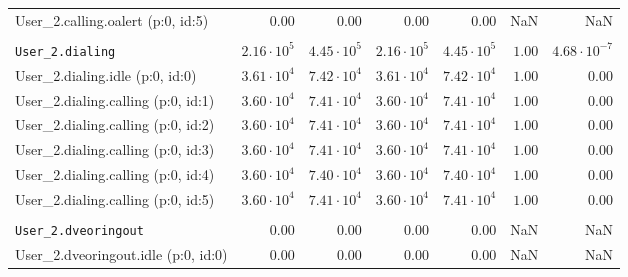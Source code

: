 \begin{table}[htbp]
{\begin{tabular}{lrrrrrr}
\hspace{3mm}User\_2.calling.oalert (p:0, id:5)       &              $0.00$ &              $0.00$ &              $0.00$ &              $0.00$ &                  NaN &                  NaN \\
\\[-8pt]\texttt{User\_2.dialing}                     & $2.16 \cdot 10^{5}$ & $4.45 \cdot 10^{5}$ & $2.16 \cdot 10^{5}$ & $4.45 \cdot 10^{5}$ &               $1.00$ & $4.68 \cdot 10^{-7}$ \\
\hspace{3mm}User\_2.dialing.idle (p:0, id:0)         & $3.61 \cdot 10^{4}$ & $7.42 \cdot 10^{4}$ & $3.61 \cdot 10^{4}$ & $7.42 \cdot 10^{4}$ &               $1.00$ &               $0.00$ \\
\hspace{3mm}User\_2.dialing.calling (p:0, id:1)      & $3.60 \cdot 10^{4}$ & $7.41 \cdot 10^{4}$ & $3.60 \cdot 10^{4}$ & $7.41 \cdot 10^{4}$ &               $1.00$ &               $0.00$ \\
\hspace{3mm}User\_2.dialing.calling (p:0, id:2)      & $3.60 \cdot 10^{4}$ & $7.41 \cdot 10^{4}$ & $3.60 \cdot 10^{4}$ & $7.41 \cdot 10^{4}$ &               $1.00$ &               $0.00$ \\
\hspace{3mm}User\_2.dialing.calling (p:0, id:3)      & $3.60 \cdot 10^{4}$ & $7.41 \cdot 10^{4}$ & $3.60 \cdot 10^{4}$ & $7.41 \cdot 10^{4}$ &               $1.00$ &               $0.00$ \\
\hspace{3mm}User\_2.dialing.calling (p:0, id:4)      & $3.60 \cdot 10^{4}$ & $7.40 \cdot 10^{4}$ & $3.60 \cdot 10^{4}$ & $7.40 \cdot 10^{4}$ &               $1.00$ &               $0.00$ \\
\hspace{3mm}User\_2.dialing.calling (p:0, id:5)      & $3.60 \cdot 10^{4}$ & $7.41 \cdot 10^{4}$ & $3.60 \cdot 10^{4}$ & $7.41 \cdot 10^{4}$ &               $1.00$ &               $0.00$ \\
\\[-8pt]\texttt{User\_2.dveoringout}                 &              $0.00$ &              $0.00$ &              $0.00$ &              $0.00$ &                  NaN &                  NaN \\
\hspace{3mm}User\_2.dveoringout.idle (p:0, id:0)     &              $0.00$ &              $0.00$ &              $0.00$ &              $0.00$ &                  NaN &                  NaN \\

\end{tabular}}
\end{table}
